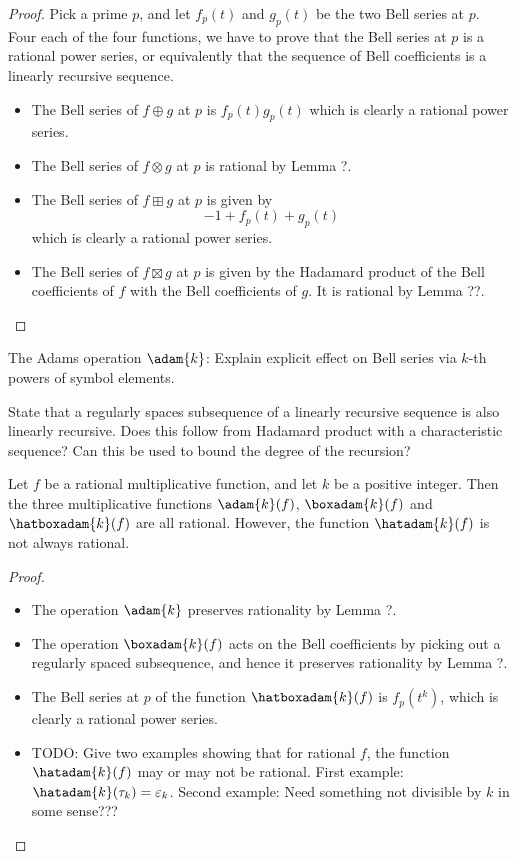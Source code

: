 \documentclass[a4paper]{article}
\begin{document}
\begin{proof}
Pick a prime $p$, and let $f_p(t)$ and $g_p(t)$ be the two Bell series at $p$. Four each of the four functions, we have to prove that the Bell series at $p$ is a rational power series, or equivalently that the sequence of Bell coefficients is a linearly recursive sequence.
\begin{itemize}
\item The Bell series of $f \oplus g$ at $p$ is $f_p(t) g_p(t)$ which is clearly a rational power series.
\item The Bell series of $f \otimes g$ at $p$ is rational by Lemma ?.
\item The Bell series of $f \boxplus g$ at $p$ is given by 
$$  -1 + f_p(t) + g_p(t)    $$
which is clearly a rational power series.
\item The Bell series of $f \boxtimes g$ at $p$ is given by the Hadamard product of the Bell coefficients of $f$ with the Bell coefficients of $g$. It is rational by Lemma ??.
\end{itemize}
\end{proof}

\begin{lemma}
The Adams operation $\adam{k}$: Explain explicit effect on Bell series via $k$-th powers of symbol elements.
\end{lemma}

\begin{lemma}
State that a regularly spaces subsequence of a linearly recursive sequence is also linearly recursive. Does this follow from Hadamard product with a characteristic sequence? Can this be used to bound the degree of the recursion?
\end{lemma}

\begin{theorem}
Let $f$ be a rational multiplicative function, and let $k$ be a positive integer. Then the three multiplicative functions $\adam{k}(f)$, $\boxadam{k}(f)$ and $\hatboxadam{k}(f)$ are all rational. However, the function $\hatadam{k}(f)$ is not always rational.
\end{theorem}

\begin{proof}
\begin{itemize}
\item The operation $\adam{k}$ preserves rationality by Lemma ?.
\item The operation $\boxadam{k}(f)$ acts on the Bell coefficients by picking out a regularly spaced subsequence, and hence it preserves rationality by Lemma ?. 
\item The Bell series at $p$ of the function $\hatboxadam{k}(f)$ is $f_p(t^k)$, which is clearly a rational power series. 
\item TODO: Give two examples showing that for rational $f$, the function $\hatadam{k}(f)$ may or may not be rational. First example: $\hatadam{k}(\tau_k) = \varepsilon_k$. Second example: Need something not divisible by $k$ in some sense???
\end{itemize}
\end{proof}
\end{document}
